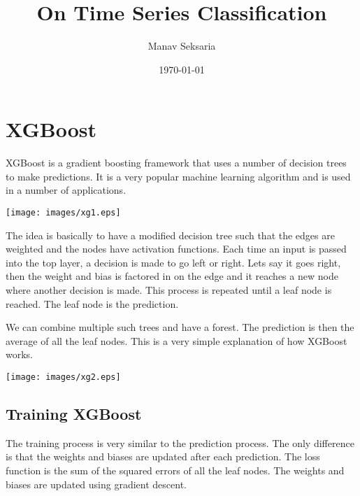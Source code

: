 \documentclass[12pt]{article}
\title{On Time Series Classification}
\author{Manav Seksaria}
\date{\today}
\numberwithin{equation}{section}
\begin{document}
\maketitle

\section{XGBoost}
XGBoost is a gradient boosting framework that uses a number of decision trees to make predictions. It is a very popular machine learning algorithm and is used in a number of applications.

\begin{center}
\texttt{[image: images/xg1.eps]}
\end{center}

The idea is basically to have a modified decision tree such that the edges are weighted and the nodes have activation functions. Each time an input is passed into the top layer, a decision is made to go left or right. Lets say it goes right, then the weight and bias is factored in on the edge and it reaches a new node where another decision is made. This process is repeated until a leaf node is reached. The leaf node is the prediction.

We can combine multiple such trees and have a forest. The prediction is then the average of all the leaf nodes. This is a very simple explanation of how XGBoost works.

\begin{center}
\texttt{[image: images/xg2.eps]}
\end{center}

\subsection{Training XGBoost}
The training process is very similar to the prediction process. The only difference is that the weights and biases are updated after each prediction. The loss function is the sum of the squared errors of all the leaf nodes. The weights and biases are updated using gradient descent.
\end{document}
